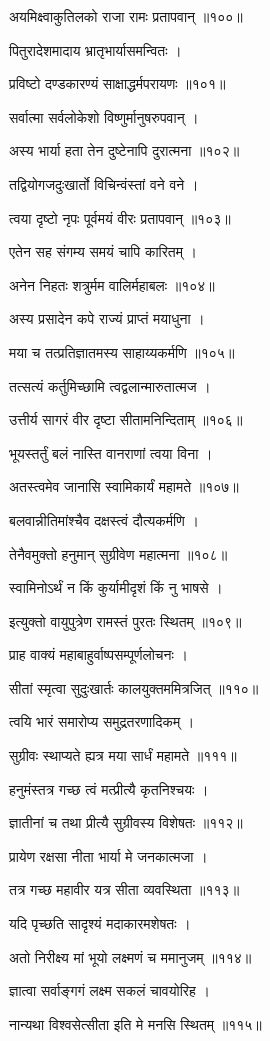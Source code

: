 अयमिक्ष्वाकुतिलको राजा रामः प्रतापवान् ॥१००॥

पितुरादेशमादाय भ्रातृभार्यासमन्वितः ।

प्रविष्टो दण्डकारण्यं साक्षाद्धर्मपरायणः ॥१०१॥

सर्वात्मा सर्वलोकेशो विष्णुर्मानुषरुपवान् ।

अस्य भार्या हता तेन दुष्टेनापि दुरात्मना ॥१०२॥

तद्वियोगजदुःखार्तो विचिन्वंस्तां वने वने ।

त्वया दृष्टो नृपः पूर्वमयं वीरः प्रतापवान् ॥१०३॥

एतेन सह संगम्य समयं चापि कारितम् ।

अनेन निहतः शत्रुर्मम वालिर्महाबलः ॥१०४॥

अस्य प्रसादेन कपे राज्यं प्राप्तं मयाधुना ।

मया च तत्प्रतिज्ञातमस्य साहाय्यकर्मणि ॥१०५॥

तत्सत्यं कर्तुमिच्छामि त्वद्वलान्मारुतात्मज ।

उत्तीर्य सागरं वीर दृष्टा सीतामनिन्दिताम् ॥१०६॥

भूयस्तर्तुं बलं नास्ति वानराणां त्वया विना ।

अतस्त्वमेव जानासि स्वामिकार्यं महामते ॥१०७॥

बलवान्नीतिमांश्चैव दक्षस्त्वं दौत्यकर्मणि ।

तेनैवमुक्तो हनुमान् सुग्रीवेण महात्मना ॥१०८॥

स्वामिनोऽर्थं न किं कुर्यामीदृशं किं नु भाषसे ।

इत्युक्तो वायुपुत्रेण रामस्तं पुरतः स्थितम् ॥१०९॥

प्राह वाक्यं महाबाहुर्वाष्पसम्पूर्णलोचनः ।

सीतां स्मृत्वा सुदुःखार्तः कालयुक्तममित्रजित् ॥११०॥

त्वयि भारं समारोप्य समुद्रतरणादिकम् ।

सुग्रीवः स्थाप्यते ह्यत्र मया सार्धं महामते ॥१११॥

हनुमंस्तत्र गच्छ त्वं मत्प्रीत्यै कृतनिश्चयः ।

ज्ञातीनां च तथा प्रीत्यै सुग्रीवस्य विशेषतः ॥११२॥

प्रायेण रक्षसा नीता भार्या मे जनकात्मजा ।

तत्र गच्छ महावीर यत्र सीता व्यवस्थिता ॥११३॥

यदि पृच्छति सादृश्यं मदाकारमशेषतः ।

अतो निरीक्ष्य मां भूयो लक्ष्मणं च ममानुजम् ॥११४॥

ज्ञात्वा सर्वाङ्गगं लक्ष्म सकलं चावयोरिह ।

नान्यथा विश्वसेत्सीता इति मे मनसि स्थितम् ॥११५॥

